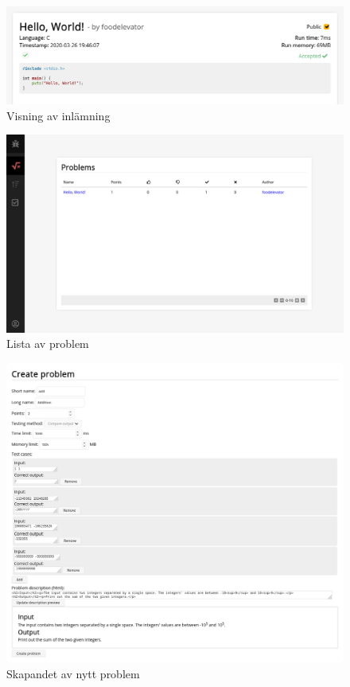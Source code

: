 \documentclass{article}
\begin{document}
\begin{figure}[H]
	\centering
	\includegraphics[width=1\textwidth]{submission}
	\caption{Visning av inlämning}
\end{figure}

\begin{figure}[H]
	\centering
	\includegraphics[width=1\textwidth]{problem-list}
	\caption{Lista av problem}
\end{figure}

\begin{figure}[H]
	\centering
	\includegraphics[width=1\textwidth]{create-problem}
	\caption{Skapandet av nytt problem}
\end{figure}
\end{document}

